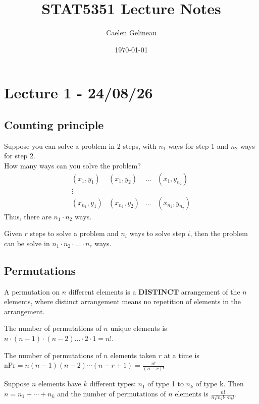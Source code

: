 \documentclass[11pt]{article}
\title{STAT5351 Lecture Notes}
\author{Caelen Gelineau}
\date{\today}
\begin{document}
\maketitle
\tableofcontents
\newpage

\section{Lecture 1 - 24/08/26}
\subsection{Counting principle}
Suppose you can solve a problem in 2 steps, with $n_1$ ways for step 1 and $n_2$ ways for step 2. \\
How many ways can you solve the problem?
\[
    \begin{matrix}
        (x_1, y_1) & (x_1, y_2) & \dots & (x_1, y_{n_2})\\
        \vdots\\
        (x_{n_1}, y_1) & (x_{n_1}, y_2) & \dots & (x_{n_1}, y_{n_2})
    \end{matrix}
\]
Thus, there are $n_1 \cdot n_2$ ways.
\begin{theorem}
    Given $r$ steps to solve a problem and $n_i$ ways to solve step $i$, then the problem can be
    solve in $n_1 \cdot n_2 \cdot \dots \cdot n_r$ ways.
\end{theorem}
\subsection{Permutations}
\begin{definition}
    A permutation on $n$ different elements is a $\textbf{DISTINCT}$ arrangement of the $n$ elements, where distinct arrangement
    means no repetition of elements in the arrangement.
\end{definition}

\begin{theorem}
    The number of permutations of $n$ unique elements is $n \cdot (n-1) \cdot (n-2) \dots \cdot 2 \cdot 1 = n!$. 
\end{theorem}

\begin{theorem}
    The number of permutations of $n$ elements taken $r$ at a time is \\
    $\text{nPr} = n(n-1)(n-2)\cdots (n-r+1) = \frac{n!}{(n-r)!}$
\end{theorem}

\begin{theorem}
    Suppose $n$ elements have $k$ different types: $n_1$ of type 1 to $n_k$ of type k. Then $n = n_1 + \cdots + n_k$ and the number
    of permutations of $n$ elements is $\frac{n!}{n_1!n_2!\cdots n_k!}$.
\end{theorem}
\end{document}
